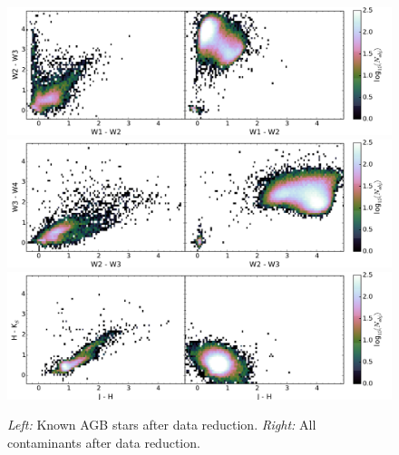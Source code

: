 \begin{figure}
\includegraphics[width=7in]{figs/agbs_contaminants_color_color1.pdf}
\includegraphics[width=7in]{figs/agbs_contaminants_color_color2.pdf}
\includegraphics[width=7in]{figs/agbs_contaminants_color_color3.pdf}
\caption{\emph{Left:} Known AGB stars after data reduction. \emph{Right:} All contaminants after data reduction.\label{fig:distros}}
\end{figure}

